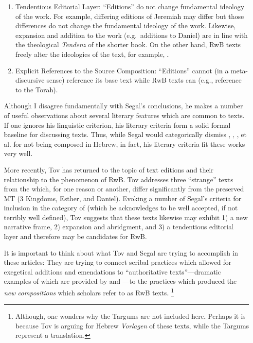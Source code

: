 \begin{enumerate}
    \item Tendentious Editorial Layer: ``Editions'' do not change fundamental ideology of the work. For example, differing editions of Jeremiah may differ but those differences do not change the fundamental ideology of the work. Likewise, expansion and addition to the work (e.g.~additions to Daniel) are in line with the theological \emph{Tendenz} of the shorter book. On the other hand, RwB texts freely alter the ideologies of the text, for example, \jub.%
        \autocite[25]{segal_henze2005}

    \item Explicit References to the Source Composition: ``Editions'' cannot (in a meta-discursive sense) reference its base text while RwB texts can (e.g., \jub reference to the Torah).
\end{enumerate} 

Although I disagree fundamentally with Segal's conclusions, he makes a number of useful observations about several literary features which are common to \rwb texts. If one ignores his linguistic criterion, his literary criteria form a solid formal baseline for discussing \rwb texts. Thus, while Segal would categorically dismiss \ga, \ant, \lab, et al. for not being composed in Hebrew, in fact, his literary criteria fit these works very well.

More recently, Tov has returned to the topic of text editions and their relationship to the phenomenon of RwB.%
    \autocite{tov_krarrer-kraus2008}
Tov addresses three ``strange'' texts from the \lxx which, for one reason or another, differ significantly from the preserved MT (3 Kingdoms, Esther, and Daniel). Evoking a number of Segal's criteria%
    \autocite{segal_henze2005}
for inclusion in the category of \rwb (which he acknowledges to be well accepted, if not terribly well defined), Tov suggests that these \lxx texts likewise may exhibit 1) a new narrative frame, 2) expansion and abridgment, and 3) a tendentious editorial layer and therefore may be candidates for RwB. 

It is important to think about what Tov and Segal are trying to accomplish in these articles: They are trying to connect scribal practices which allowed for exegetical additions and emendations to ``authoritative texts''---dramatic examples of which are provided by \sampent and \lxx---to the practices which produced the \emph{new compositions} which scholars refer to as RwB texts.%
    \footnote{Although, one wonders why the Targums are not included here. Perhaps it is because Tov is arguing for Hebrew \emph{Vorlagen} of these texts, while the Targums represent a translation.}

